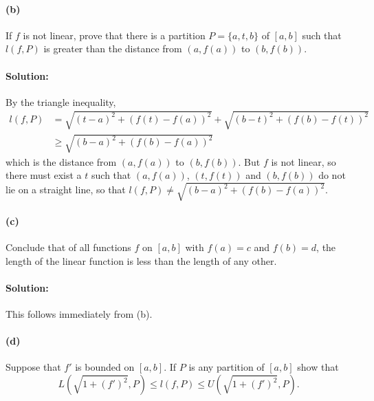 \documentclass{article}
\begin{document}
\paragraph{(b)} If $f$ is not linear, prove that there is a partition $P = \{a,
t, b\}$ of $[a, b]$ such that $l(f, P)$ is greater than the distance from $(a,
f(a))$ to $(b, f(b))$.

\paragraph{Solution:} By the triangle inequality, \begin{align*}
  l(f, P) &= \sqrt{(t - a)^2 + (f(t) - f(a))^2} + \sqrt{(b - t)^2 + (f(b) -
    f(t))^2} \\
    &\geq \sqrt{(b - a)^2 + (f(b) - f(a))^2}
\end{align*} which is the distance from $(a, f(a))$ to $(b, f(b))$. But $f$ is
not linear, so there must exist a $t$ such that $(a, f(a))$, $(t, f(t))$ and
$(b, f(b))$ do not lie on a straight line, so that $l(f, P) \neq
\sqrt{(b - a)^2 + (f(b) - f(a))^2}$.

\paragraph{(c)} Conclude that of all functions $f$ on $[a, b]$ with $f(a) = c$
and $f(b) = d$, the length of the linear function is less than the length of
any other.

\paragraph{Solution:} This follows immediately from (b).

\paragraph{(d)} Suppose that $f'$ is bounded on $[a, b]$. If $P$ is any
partition of $[a, b]$ show that \begin{equation*}
  L(\sqrt{1 + (f')^2}, P) \leq l(f, P) \leq U(\sqrt{1 + (f')^2}, P).
\end{equation*}
\end{document}
